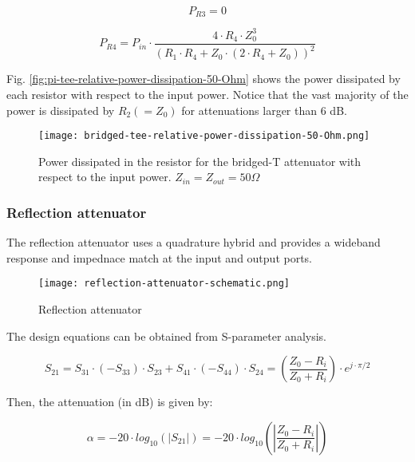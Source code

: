 \begin{equation}
    P_{R3} = 0
\end{equation}

\begin{equation}
    P_{R4} = P_{in} \cdot  \frac{4 \cdot R_4 \cdot Z_0^3}{(R_1 \cdot R_4 + Z_0 \cdot (2 \cdot R_4 + Z_0))^2}
\end{equation}

\noindent Fig. \ref{fig:pi-tee-relative-power-dissipation-50-Ohm} shows the power dissipated by each resistor with respect to the input power. Notice that the vast majority of the power is dissipated by $R_2 (= Z_0)$ for attenuations larger than 6 dB.


\begin{figure}[ht]
    \centering
    \texttt{[image: bridged-tee-relative-power-dissipation-50-Ohm.png]}
    \caption{Power dissipated in the resistor for the bridged-T attenuator with respect to the input power. $Z_{in} = Z_{out} = 50 \Omega$}
    \label{fig:bridged-tee-relative-power-dissipation-50-Ohm}
\end{figure}

\subsubsection{Reflection attenuator}

\noindent The reflection attenuator \cite{pin_diode_designer_handbook} uses a quadrature hybrid and provides a wideband response and impednace match at the input and output ports.

\begin{figure}[ht]
    \centering
    \texttt{[image: reflection-attenuator-schematic.png]}
    \caption{Reflection attenuator}
    \label{fig:reflection-attenuator-schematic}
\end{figure}

\noindent The design equations can be obtained from S-parameter analysis.

\begin{equation}
    S_{21} = S_{31} \cdot (-S_{33}) \cdot S_{23} + S_{41} \cdot (-S_{44}) \cdot S_{24} = \left( \frac{Z_0 - R_i}{Z_0 + R_i} \right) \cdot e^{j \cdot \pi/2}
\end{equation}

\noindent Then, the attenuation (in dB) is given by:

\begin{equation}
    \alpha = -20 \cdot log_{10} \left( \lvert S_{21} \rvert \right) = -20 \cdot log_{10} \left( \left| \frac{Z_0 - R_i}{Z_0 + R_i} \right| \right)
    \label{eq:attenuation-eq-reflection-attenuator}
\end{equation}

